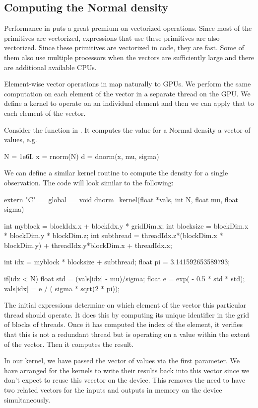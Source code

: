 \subsection{Computing the Normal density}\label{subsec:normal}
Performance in \R{} puts a great premium on vectorized
operations.  Since most of the primitives are vectorized,
expressions that use these primitives are also vectorized. 
Since these primitives are vectorized in \C{} code,
they are fast.  Some of them also use multiple
processors when the vectors are sufficiently large
and there are additional available CPUs.

Element-wise vector operations in \R{} map naturally to GPUs.  We
perform the same computation on each element of the vector in a
separate thread on the GPU.  We define a kernel to operate on an
individual element and then we can apply that to each element of the
vector.

Consider the function  in \R.
It computes the value for a Normal density
a vector of values, e.g.
\begin{RCode}
N = 1e6L
x = rnorm(N)
d = dnorm(x, mu, sigma)
\end{RCode}

We can define a similar kernel routine to compute
the density for a single observation.
The code will look similar to the following:
\begin{CCode}
extern "C"
__global__ void 
dnorm_kernel(float *vals, int N, float mu, float sigma)
{
    int myblock = blockIdx.x + blockIdx.y * gridDim.x;
    int blocksize = blockDim.x * blockDim.y * blockDim.z;
    int subthread = threadIdx.z*(blockDim.x * blockDim.y) +
                      threadIdx.y*blockDim.x + threadIdx.x;

    int idx = myblock * blocksize + subthread;
    float pi = 3.141592653589793;

    if(idx < N) {
       float std = (vals[idx] - mu)/sigma;
       float e = exp( - 0.5 * std * std);
       vals[idx] = e / ( sigma * sqrt(2 * pi));
    }
}
\end{CCode}
The initial expressions determine on which element of the vector this
particular thread should operate.  It does this by computing its
unique identifier in the grid of blocks of threads.  Once it has
computed the index of the element, it verifies that this is not a
redundant thread but is operating on a value within the extent of the
vector.  Then it computes the result.

In our kernel, we have passed the vector of values via the first
parameter.  We have arranged for the kernels to write their results
back into this vector since we don't expect to reuse this veector on
the device. This removes the need to have two related vectors for the
inputs and outputs in memory on the device simultaneously.

